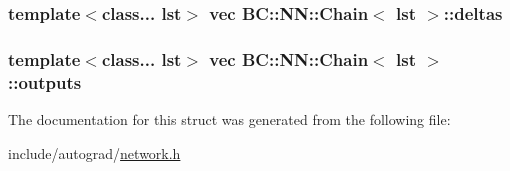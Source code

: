 \subsubsection[{\texorpdfstring{deltas}{deltas}}]{\setlength{\rightskip}{0pt plus 5cm}template$<$class... lst$>$ vec {\bf B\+C\+::\+N\+N\+::\+Chain}$<$ lst $>$\+::deltas}\hypertarget{structBC_1_1NN_1_1Chain_a857ba54a8bbfd9f01c34d225fcaad9f0}{}\label{structBC_1_1NN_1_1Chain_a857ba54a8bbfd9f01c34d225fcaad9f0}
\subsubsection[{\texorpdfstring{outputs}{outputs}}]{\setlength{\rightskip}{0pt plus 5cm}template$<$class... lst$>$ vec {\bf B\+C\+::\+N\+N\+::\+Chain}$<$ lst $>$\+::outputs}\hypertarget{structBC_1_1NN_1_1Chain_a2090e18b2f5bf4b2aa751a8abc7ace13}{}\label{structBC_1_1NN_1_1Chain_a2090e18b2f5bf4b2aa751a8abc7ace13}


The documentation for this struct was generated from the following file\+:\begin{DoxyCompactItemize}
\item 
include/autograd/\hyperlink{network_8h}{network.\+h}\end{DoxyCompactItemize}
